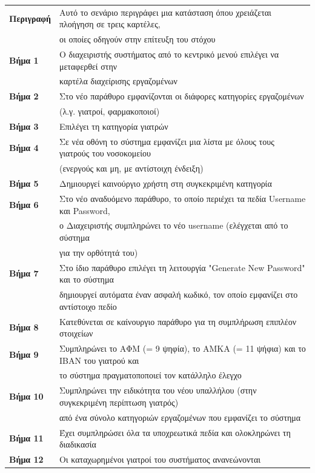 \documentclass{article}
\newcommand\T{\rule{0pt}{2.6ex}}       %
\newcommand\B{\rule[-1.2ex]{0pt}{0pt}}
\begin{document}
 \begin{center}
     \begin{tabular}{|l|l|}
     \hline
      \textbf{Περιγραφή} & Αυτό το σενάριο περιγράφει μια κατάσταση όπου χρειάζεται πλοήγηση σε τρεις καρτέλες, \T \\& οι οποίες οδηγούν στην επίτευξη του στόχου \B \\ 
      \hline
      \textbf{Βήμα 1} & Ο διαχειριστής συστήματος από το κεντρικό μενού επιλέγει να μεταφερθεί στην \T \\& καρτέλα διαχείρισης εργαζομένων \T\B \\
      \hline
      \textbf{Βήμα 2} & Στο νέο παράθυρο εμφανίζονται οι διάφορες κατηγορίες εργαζομένων \T \\& (λ.γ. γιατροί, φαρμακοποιοί) \B \\
      \hline
      \textbf{Βήμα 3} & Επιλέγει τη κατηγορία γιατρών \T\B \\
      \hline
      \textbf{Βήμα 4} & Σε νέα οθόνη το σύστημα εμφανίζει μια λίστα με όλους τους γιατρούς του νοσοκομείου \T \\& (ενεργούς και μη, με αντίστοιχη ένδειξη) \B \\
      \hline
      \textbf{Βήμα 5} & Δημιουργεί καινούργιο χρήστη στη συγκεκριμένη κατηγορία \T\B \\
      \hline
      \textbf{Βήμα 6} & Στο νέο αναδυόμενο παράθυρο, το οποίο περιέχει τα πεδία Username και Password, \T \\& ο Διαχειριστής συμπληρώνει το νέο username (ελέγχεται από το σύστημα \\& για την ορθότητά του) \B \\
      \hline
      \textbf{Βήμα 7} & Στο ίδιο παράθυρο επιλέγει τη λειτουργία "Generate New Password" και το σύστημα \T \\& δημιουργεί αυτόματα έναν ασφαλή κωδικό, τον οποίο εμφανίζει στο αντίστοιχο πεδίο\B \\
      \hline
       \textbf{Βήμα 8} & Κατεθύνεται σε καίνουργιο παράθυρο για τη συμπλήρωση επιπλέον στοιχείων \T\B \\
      \hline
      \textbf{Βήμα 9} & Συμπληρώνει το ΑΦΜ (= 9 ψηφία), το ΑΜΚΑ (= 11 ψήφια) και το IBAN του γιατρού και \T \\& το σύστημα πραγματοποποιεί τον κατάλληλο έλεγχο \B \\
      \hline
      \textbf{Βήμα 10} & Συμπληρώνει την ειδικότητα του νέου υπαλλήλου (στην συγκεκριμένη περίπτωση γιατρός) \T \\& από ένα σύνολο κατηγοριών εργαζομένων που εμφανίζει το σύστημα \B \\
      \hline
      \textbf{Βήμα 11} & Έχει συμπληρώσει όλα τα υποχρεωτικά πεδία και ολοκληρώνει τη διαδικασία \T\B \\
      \hline
      \textbf{Βήμα 12} & Οι καταχωρημένοι γιατροί του συστήματος ανανεώνονται \T\B \\
      \hline
     \end{tabular}
 \end{center}
 
\end{document}
